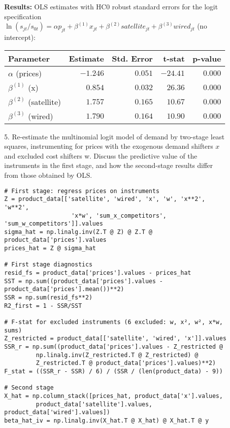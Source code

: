 \documentclass[english,11pt]{article}
\begin{document}
\begin{enumerate}
\begin{enumerate}
\textbf{Results:} OLS estimates with HC0 robust standard errors for the logit specification $\ln(s_{jt}/s_{0t}) = \alpha p_{jt} + \beta^{(1)} x_{jt} + \beta^{(2)} satellite_{jt} + \beta^{(3)} wired_{jt}$ (no intercept):

\begin{center}
\begin{tabular}{lrrrr}
\hline
Parameter & Estimate & Std. Error & t-stat & p-value \\
\hline
$\alpha$ (prices) & $-1.246$ & $0.051$ & $-24.41$ & $0.000$ \\
$\beta^{(1)}$ (x) & $0.854$ & $0.032$ & $26.36$ & $0.000$ \\
$\beta^{(2)}$ (satellite) & $1.757$ & $0.165$ & $10.67$ & $0.000$ \\
$\beta^{(3)}$ (wired) & $1.790$ & $0.164$ & $10.90$ & $0.000$ \\
\hline
\end{tabular}
\end{center}

\item[5.] Re-estimate the multinomial logit model of demand by two-stage
least squares, instrumenting for prices with the exogenous demand shifters $%
x $ and excluded cost shifters w. Discuss the predictive value of the instruments in the first stage, and how the second-stage results differ from those
obtained by OLS.

\begin{verbatim}
# First stage: regress prices on instruments
Z = product_data[['satellite', 'wired', 'x', 'w', 'x**2', 'w**2', 
                   'x*w', 'sum_x_competitors', 'sum_w_competitors']].values
sigma_hat = np.linalg.inv(Z.T @ Z) @ Z.T @ product_data['prices'].values
prices_hat = Z @ sigma_hat

# First stage diagnostics
resid_fs = product_data['prices'].values - prices_hat
SST = np.sum((product_data['prices'].values - product_data['prices'].mean())**2)
SSR = np.sum(resid_fs**2)
R2_first = 1 - SSR/SST

# F-stat for excluded instruments (6 excluded: w, x², w², x*w, sums)
Z_restricted = product_data[['satellite', 'wired', 'x']].values
SSR_r = np.sum((product_data['prices'].values - Z_restricted @ 
         np.linalg.inv(Z_restricted.T @ Z_restricted) @ 
         Z_restricted.T @ product_data['prices'].values)**2)
F_stat = ((SSR_r - SSR) / 6) / (SSR / (len(product_data) - 9))

# Second stage
X_hat = np.column_stack([prices_hat, product_data['x'].values,
         product_data['satellite'].values, product_data['wired'].values])
beta_hat_iv = np.linalg.inv(X_hat.T @ X_hat) @ X_hat.T @ y


\end{verbatim}
\end{enumerate}
\end{enumerate}
\end{document}
